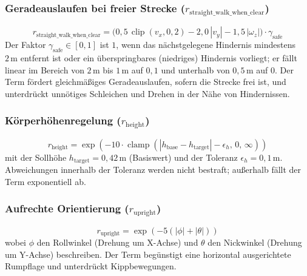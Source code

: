 \subsubsection{Geradeauslaufen bei freier Strecke ($r_{\text{straight\_walk\_when\_clear}}$)}
\begin{equation}\label{eq:nav_straight}
r_{\text{straight\_walk\_when\_clear}} = \big(0{,}5\,\operatorname{clip}(v_x,0,2) - 2{,}0\,|v_y| - 1{,}5\,|\omega_z|\big)\cdot \gamma_{\text{safe}}
\end{equation}
Der Faktor $\gamma_{\text{safe}}\in[0,1]$ ist $1$, wenn das nächstgelegene Hindernis mindestens $2\,\text{m}$ entfernt ist oder ein überspringbares (niedriges) Hindernis vorliegt; er fällt linear im Bereich von $2\,\text{m}$ bis $1\,\text{m}$ auf $0{,}1$ und unterhalb von $0{,}5\,\text{m}$ auf $0$. Der Term fördert gleichmäßiges Geradeauslaufen, sofern die Strecke frei ist, und unterdrückt unnötiges Schleichen und Drehen in der Nähe von Hindernissen.

\subsubsection{Körperhöhenregelung ($r_{\text{height}}$)}
\begin{equation}\label{eq:nav_height_term}
r_{\text{height}} = \exp\!\left(-10\cdot \operatorname{clamp}\!\left(\left|h_{\text{base}} - h_{\text{target}}\right| - \epsilon_h,\, 0,\, \infty\right)\right)
\end{equation}
mit der Sollhöhe $h_{\text{target}} = 0{,}42\,\text{m}$ (Basiswert) und der Toleranz $\epsilon_h = 0{,}1\,\text{m}$. Abweichungen innerhalb der Toleranz werden nicht bestraft; außerhalb fällt der Term exponentiell ab.

\subsubsection{Aufrechte Orientierung ($r_{\text{upright}}$)}
\begin{equation}\label{eq:nav_upright_term}
r_{\text{upright}} = \exp\!\left(-5 \left(|\phi| + |\theta|\right)\right)
\end{equation}
wobei $\phi$ den Rollwinkel (Drehung um X-Achse) und $\theta$ den Nickwinkel (Drehung um Y-Achse) beschreiben. Der Term begünstigt eine horizontal ausgerichtete Rumpflage und unterdrückt Kippbewegungen.

